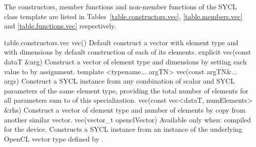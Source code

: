 The constructors, member functions and non-member functions of the SYCL  class template are listed in Tables~\ref{table.constructors.vec}, \ref{table.members.vec} and \ref{table.functions.vec} respectively.


{table.constructors.vec}
  \addRow
    {vec()}
    {
      Default construct a vector with element type  and
      with  dimensions by default construction of
      each of its elements.
    }
  \addRow
    {explicit vec(const dataT \&arg)}
    {
      Construct a vector of element type  and
       dimensions by setting each value to  by
      assignment.
    }
  \addRowTwoL
    {template <typename... argTN>}
    {vec(const argTN\&... args)}
    {
      Construct a SYCL  instance from any combination of scalar and SYCL  parameters of the same element type, providing the total number of elements for all parameters sum to  of this  specialization.
    }    
  \addRow
    {vec(const vec<dataT, numElements> \&rhs)}
    {
      Construct a vector of element type  and number of elements  by copy from another similar vector.
    }
  \addRow
    {vec(vector_t openclVector)}
    {
      Available only when: compiled for the device.
      \newline
      Constructs a SYCL  instance from an instance of the underlying OpenCL vector type defined by .
    }
\completeTable

